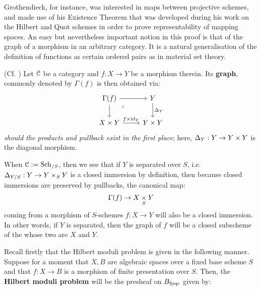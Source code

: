         Grothendieck, for instance, was interested in maps between projective schemes, and made use of his Existence Theorem that was developed during his work on the Hilbert and Quot schemes in order to prove representability of mapping spaces. An easy but nevertheless important notion in this proof is that of the graph of a morphism in an arbitrary category. It is a natural generalisation of the definition of functions as certain ordered pairs as in material set theory. 
        \begin{definition} \label{def: graphs_of_morphisms}
            (Cf. \cite[\href{https://stacks.math.columbia.edu/tag/024T}{Tag 024T}]{stacks}) Let $\mathcal{C}$ be a category and $f: X \to Y$ be a morphism therein. Its \textbf{graph}, commonly denoted by $\Gamma(f)$ is then obtained via:
                $$
                    \begin{tikzcd}
                    {\Gamma(f)} & Y \\
                    {X \x Y} & {Y \x Y}
                    \arrow[from=1-1, to=1-2]
                    \arrow[from=1-1, to=2-1]
                    \arrow["\lrcorner"{anchor=center, pos=0.125}, draw=none, from=1-1, to=2-2]
                    \arrow["{\Delta_Y}", from=1-2, to=2-2]
                    \arrow["{f \x \id_Y}", from=2-1, to=2-2]
                    \end{tikzcd}
                $$
            \textit{should the products and pullback exist in the first place}; here, $\Delta_Y: Y \to Y \x Y$ is the diagonal morphism.
        \end{definition}
        \begin{remark}
            When $\mathcal{C} := \mathrm{Sch}_{/S}$, then we see that if $Y$ is separated over $S$, i.e. $\Delta_{Y/S}: Y \to Y \x_S Y$ is a closed immersion by definition, then because closed immersions are preserved by pullbacks, the canonical map:
                $$\Gamma(f) \to X \x_S Y$$
            coming from a morphism of $S$-schemes $f: X \to Y$ will also be a closed immersion. In other words, if $Y$ is separated, then the graph of $f$ will be a closed subscheme of the  whose two  are $X$ and $Y$.
        \end{remark}
        Recall firstly that the Hilbert moduli problem is given in the following manner. Suppose for a moment that $X, B$ are algebraic spaces over a fixed base scheme $S$ and that $f: X \to B$ is a morphism of finite presentation over $S$. Then, the \textbf{Hilbert moduli problem} will be the presheaf on $B_{\mathrm{fpqc}}$ given by:
